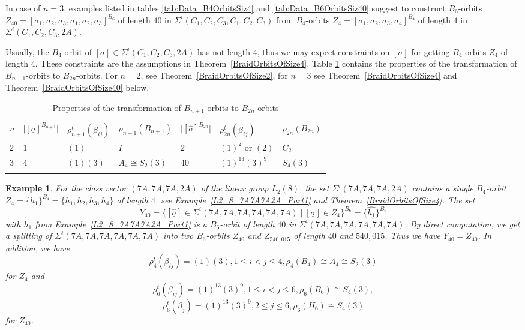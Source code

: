 \documentclass[12pt,a4paper]{article}
\newtheorem{example}{Example}[section]
\numberwithin{equation}{section}
\numberwithin{table}{section}
\begin{document}
%
\noindent
In case of $n=3$, examples listed in tables \ref{tab:Data_B4OrbitsSiz4} and \ref{tab:Data_B6OrbitsSiz40} suggest 
to construct $B_6$-orbits $Z_{40} = [\sigma_1, \sigma_2, \sigma_3, \sigma_1, \sigma_2, \sigma_3]^{B_6}$ of 
length $40$ in $\Sigma^i(C_1,C_2,C_3,C_1,C_2,C_3)$ from $B_4$-orbits 
$Z_4 = [\sigma_1, \sigma_2, \sigma_3, \sigma_4]^{B_4}$ of length $4$ in $\Sigma^i(C_1,C_2,C_3,2A)$.
\par
\noindent
Usually, the $B_4$-orbit of $[\underline{\sigma}] \in \Sigma^i(C_1,C_2,C_3,2A)$ has not length $4$,
thus we may expect constraints on $[\underline{\sigma}]$ for getting $B_4$-orbits $Z_4$ of length $4$.
These constraints are the assumptions in Theorem~\ref{BraidOrbitsOfSize4}.
Table \ref{tab:PropertiesTransformationOfOrbits} contains the properties of the transformation of $B_{n+1}$-orbits to $B_{2n}$-orbits.
For $n=2$, see Theorem~\ref{BraidOrbitsOfSize2}, for $n=3$ see Theorem~\ref{BraidOrbitsOfSize4} and Theorem~\ref{BraidOrbitsOfSize40} below.
%
\begin{table}[!htbp]
\centering
\footnotesize
\captionsetup{font=footnotesize}
\caption{Properties of the transformation of $B_{n+1}$-orbits to $B_{2n}$-orbits}
\label{tab:PropertiesTransformationOfOrbits}
\begin{tabular}{lllllll}
\hline\noalign{\smallskip}
$n$ & $\vert [\underline{\sigma}]^{B_{n+1}} \vert$ & $\rho^t_{n+1}(\beta_{ij})$ & $\rho_{n+1}(B_{n+1})$ 
& $\vert [\widehat{\underline{\sigma}}]^{B_{2n}} \vert$ & $\rho^t_{2n}(\beta_{ij})$ & $\rho_{2n}(B_{2n})$\\
\noalign{\smallskip}\hline\noalign{\smallskip}
2   & 1 & $(1)$    & $I$   & 2  & $(1)^2$ or $(2)$ & $C_2$ \\
3   & 4 & $(1)(3)$ & $A_4 \cong S_2(3)$ & 40 & $(1)^{13}(3)^9$  & $S_4(3)$ \\
\noalign{\smallskip}\hline
\end{tabular}
\end{table}
%
\begin{example}
\label{L2_8_7A7A7A2A_Part2}
For the class vector $(7A,7A,7A,2A)$ of the linear group $L_2(8)$, the set
$\Sigma^i(7A,7A,7A,2A)$ contains a single $B_4$-orbit
$Z_4 = \{ h_1 \}^{B_4} = \{ h_1,h_2,h_3,h_4 \}$ of length $4$, see Example~\ref{L2_8_7A7A7A2A_Part1} and Theorem~\ref{BraidOrbitsOfSize4}.
The set 
$$Y_{40} = \{ [\widehat{\underline{\sigma}}] \in \Sigma^i(7A,7A,7A,7A,7A,7A) \mid 
[\underline{\sigma}] \in Z_4 \}^{B_6} = \{ \widehat{h_1} \}^{B_6}$$
with $h_1$ from Example~\ref{L2_8_7A7A7A2A_Part1} is a $B_6$-orbit of length $40$ in $\Sigma^i(7A,7A,7A,7A,7A,7A)$.
By direct computation, we get a splitting of $\Sigma^i(7A,7A,7A,7A,7A,7A)$ into two $B_6$-orbits
$Z_{40}$ and $Z_{540,015}$ of length $40$ and $540,015$. Thus we have $Y_{40} = Z_{40}$.
In addition, we have 
$$\rho^t_4(\beta_{ij}) = (1)(3), 1 \leq i < j \leq 4, \rho_4(B_4) \cong A_4 \cong S_2(3)$$
for $Z_4$ and
$$\rho^t_6(\beta_{ij}) = (1)^{13}(3)^9, 1 \leq i < j \leq 6, \rho_6(B_6) \cong S_4(3),$$
$$\rho^t_6(\beta_j) = (1)^{13}(3)^9, 2 \leq j \leq 6, \rho_6(H_6) \cong S_4(3)$$
for $Z_{40}$.
\end{example}
\end{document}
